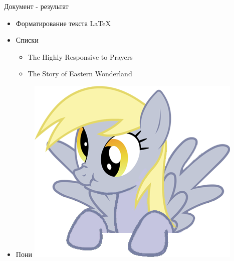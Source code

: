 \begin{frame}[fragile]{Документ - результат}
  \begin{itemize}
    \item Форматирование текста
        {\Large \LaTeX}
    \item Списки
      \begin{itemize}
        \item The Highly Responsive to Prayers
        \item The Story of Eastern Wonderland
      \end{itemize}
    \item Пони
      \includegraphics[scale=0.1]{img/Derpy_hooves}
  \end{itemize}
\end{frame}
